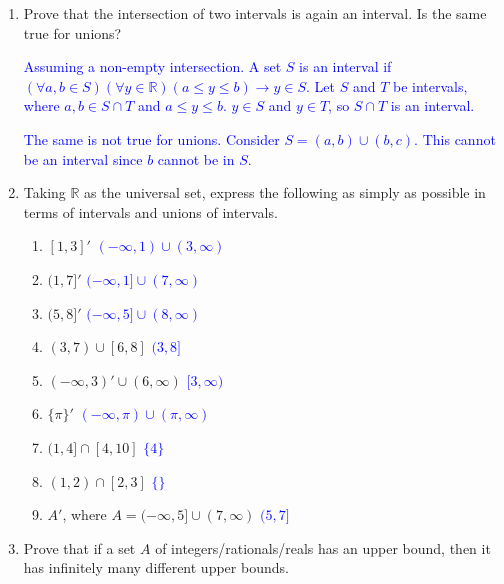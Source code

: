 \documentclass[13.5pt]{article}
\begin{document}
\begin{enumerate}

\item{Prove that the intersection of two intervals is again an interval. Is the same true for unions?}

\textcolor{blue} {Assuming a non-empty intersection. A set \(S\) is an interval if \((\forall a,b \in S)( \forall y \in \mathbb{R})(a \leq y \leq b) \rightarrow y \in S\). Let \(S\) and \(T\) be intervals, where \(a, b \in S\cap T\) and  \(a \leq y \leq b\). \(y \in S\) and \(y \in T\), so \(S\cap T\) is an interval.}\


\textcolor{blue} {The same is not true for unions. Consider \(S=(a,b) \cup (b,c)\). This cannot be an interval since \(b\) cannot be in \(S\).}

\item{Taking \(\mathbb{R}\) as the universal set, express the following as simply as possible in terms of intervals and unions of intervals.}

\begin{enumerate}
\setlength{\itemindent}{.1in}
\item{\([1,3]'\)}
\textcolor{blue} {\((-\infty,1)\cup(3,\infty)\)}

\item{\((1,7]'\)}
\textcolor{blue} {\((-\infty,1]\cup(7,\infty)\)}

\item{\((5,8]'\)}
\textcolor{blue} {\((-\infty,5]\cup(8,\infty)\)}

\item{\((3,7) \cup [6,8]\)}
\textcolor{blue} {\((3,8]\)}

\item{\((-\infty,3)' \cup (6,\infty)\)}
\textcolor{blue} {\([3,\infty)\)}

\item{ \( \{ \pi \}' \) }
\textcolor{blue} {\((-\infty,\pi)\cup(\pi,\infty)\)}

\item{\((1,4] \cap [4,10]\)}
\textcolor{blue} {$\{4\}$}

\item{\((1,2) \cap [2,3]\)}
\textcolor{blue} {$\{ \}$}

\item{\(A'\), where  \(A=(-\infty,5] \cup (7,\infty)\)}
\textcolor{blue} {\((5,7]\)}

\end{enumerate}

\item{Prove that if a set \(A\) of integers/rationals/reals has an upper bound, then it has infinitely many different upper bounds.}


\end{enumerate}
\end{document}

